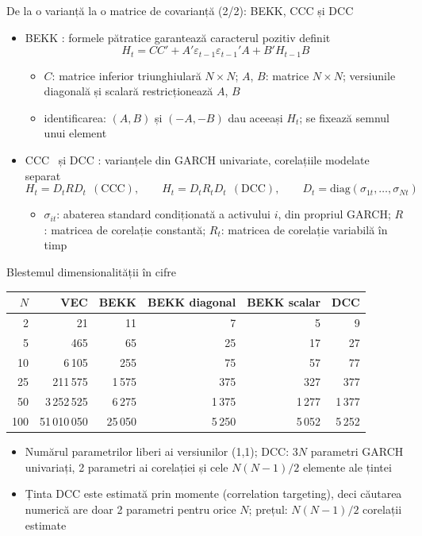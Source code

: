 \begin{frame}{De la o varianță la o matrice de covarianță (2/2): BEKK, CCC și DCC}
\itemsize{\small}
\begin{itemize}
    \item BEKK : formele pătratice garantează caracterul pozitiv definit
    \[ H_t = CC' + A'\varepsilon_{t-1}\varepsilon_{t-1}'A + B'H_{t-1}B \]
    \begin{itemize}
        \item $C$: matrice inferior triunghiulară $N \times N$; $A$, $B$: matrice $N \times N$; versiunile diagonală și scalară restricționează $A$, $B$
        \item identificarea: $(A, B)$ și $(-A, -B)$ dau aceeași $H_t$; se fixează semnul unui element
    \end{itemize}
    \item CCC \ și DCC : varianțele din GARCH univariate, corelațiile modelate separat
    \[ H_t = D_tRD_t\ \ (\text{CCC}), \qquad H_t = D_tR_tD_t\ \ (\text{DCC}), \qquad D_t = \mathrm{diag}(\sigma_{1t}, \dots, \sigma_{Nt}) \]
    \begin{itemize}
        \item $\sigma_{it}$: abaterea standard condiționată a activului $i$, din propriul GARCH; $R$: matricea de corelație constantă; $R_t$: matricea de corelație variabilă în timp
    \end{itemize}
\end{itemize}
\end{frame}

\begin{frame}{Blestemul dimensionalității în cifre}
\itemsize{\small}
\begin{center}
\footnotesize
\begin{tabular}{rrrrrr}
\toprule
$N$ & VEC & BEKK & BEKK diagonal & BEKK scalar & DCC \\
\midrule
2 & 21 & 11 & 7 & 5 & 9 \\
5 & 465 & 65 & 25 & 17 & 27 \\
10 & 6\,105 & 255 & 75 & 57 & 77 \\
25 & 211\,575 & 1\,575 & 375 & 327 & 377 \\
50 & 3\,252\,525 & 6\,275 & 1\,375 & 1\,277 & 1\,377 \\
100 & 51\,010\,050 & 25\,050 & 5\,250 & 5\,052 & 5\,252 \\
\bottomrule
\end{tabular}
\end{center}
\begin{itemize}
    \item Numărul parametrilor liberi ai versiunilor (1,1); DCC: $3N$ parametri GARCH univariați, 2 parametri ai corelației și cele $N(N-1)/2$ elemente ale țintei
    \item Ținta DCC este estimată prin momente (correlation targeting), deci căutarea numerică are doar 2 parametri pentru orice $N$; prețul: $N(N-1)/2$ corelații estimate
\end{itemize}
\end{frame}

